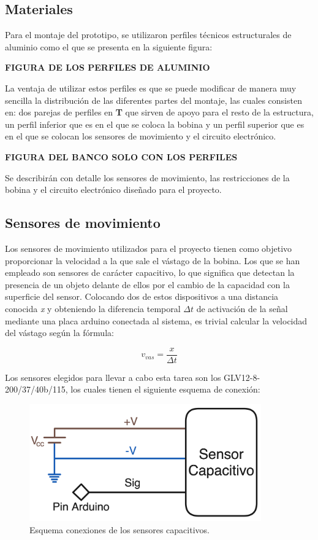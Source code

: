 \newpage

\subsection{Materiales}
\label{subsec:materiales}
Para el montaje del prototipo, se utilizaron perfiles técnicos estructurales de aluminio como el que se presenta en la siguiente figura:

\textbf{FIGURA DE LOS PERFILES DE ALUMINIO}

La ventaja de utilizar estos perfiles es que se puede modificar de manera muy sencilla la distribución de las diferentes partes del montaje, las cuales consisten en: dos parejas de perfiles en \textbf{T} que sirven de apoyo para el resto de la estructura, un perfil inferior que es en el que se coloca la bobina y un perfil superior que es en el que se colocan los sensores de movimiento y el circuito electrónico.

\textbf{FIGURA DEL BANCO SOLO CON LOS PERFILES}

Se describirán con detalle los sensores de movimiento, las restricciones de la bobina y el circuito electrónico diseñado para el proyecto.

\subsection{Sensores de movimiento}
\label{subsec:sensoresmov}

Los sensores de movimiento utilizados para el proyecto tienen como objetivo proporcionar la velocidad a la que sale el vástago de la bobina. Los que se han empleado son sensores de carácter capacitivo, lo que significa que detectan la presencia de un objeto delante de ellos por el cambio de la capacidad con la superficie del sensor. Colocando dos de estos dispositivos a una distancia conocida \textit{x} y obteniendo la diferencia temporal \(\Delta t\) de activación de la señal mediante una placa arduino conectada al sistema, es trivial calcular la velocidad del vástago según la fórmula:

\[v_{vas}=\frac{x}{\Delta t}\]

Los sensores elegidos para llevar a cabo esta tarea son los GLV12-8-200/37/40b/115, los cuales tienen el siguiente esquema de conexión:

\begin{figure}[H]
    \centering
    \includegraphics[width=10cm]{FigurasMemoria/esquemaSensor.png}
    \caption{Esquema conexiones de los sensores capacitivos.}
    \label{fig:esquemaSensor} %
\end{figure}

